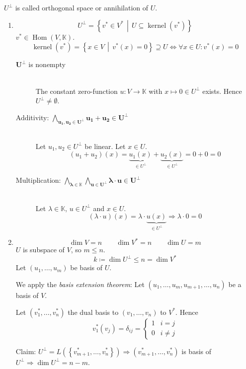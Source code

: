 \documentclass[a4paper]{article}
\theoremstyle{definition}
\DeclareMathOperator\kernel{kernel}
\DeclareMathOperator\Hom{Hom}
\newcommand\set[1]{\left\{#1\right\}}
\newcommand\setdef[2]{\left\{#1\,\middle|\,#2\right\}}
\begin{document}
$U^\bot$ is called orthogonal space or annihilation of $U$.

\begin{enumerate}
  \item
    \[ U^\bot = \setdef{v^* \in V^*}{U \subseteq \kernel(v^*)} \]
    $v^* \in \Hom(V,\mathbb K)$.
    \[ \kernel(v^*) = \setdef{x \in V}{v^*(x) = 0} \supseteq U \Leftrightarrow \forall x \in U: v^*(x) = 0 \]

    \begin{description}
      \item[$\mathbf{U^\bot}$ is nonempty] \hfill{} \\
        The constant zero-function $u: V \to \mathbb K$ with $x \mapsto 0 \in U^\bot$ exists.
        Hence $U^\bot \neq \emptyset$.
      \item[Additivity: $\mathbf{\bigwedge_{u_1,u_2 \in U^\bot} u_1 + u_2 \in U^\bot}$] \hfill{} \\
        Let $u_1,u_2 \in U^\bot$ be linear. Let $x \in U$.
        \[ (u_1 + u_2)(x) = \underbrace{u_1(x)}_{\in U^\bot} + \underbrace{u_2(x)}_{\in U^\bot} = 0 + 0 = 0 \]
      \item[Multiplication: $\mathbf{\bigwedge_{\lambda \in \mathbb K} \bigwedge_{u \in U^\bot} \lambda \cdot u \in U^\bot}$] \hfill{} \\
        Let $\lambda \in \mathbb K$, $u \in U^\bot$ and $x \in U$.
        \[ (\lambda \cdot u)(x) = \lambda \cdot \underbrace{u(x)}_{\in U^\bot} \Rightarrow \lambda \cdot 0 = 0 \]
    \end{description}

  \item
    \[ \dim{V} = n \qquad \dim{V^*} = n \qquad \dim{U} = m \]
    $U$ is subspace of $V$, so $m \leq n$.
    \[ k \coloneqq \dim{U^\bot} \leq n = \dim{V^*} \]
    Let $(u_1, \ldots, u_m)$ be basis of $U$.

    We apply the \emph{basis extension theorem}:
    Let $(u_1, \ldots, u_m, u_{m+1}, \ldots, u_n)$ be a basis of $V$.

    Let $(v_1^*, \ldots, v_n^*)$ the dual basis to $(v_1, \ldots, v_n)$ to $V^*$.
    Hence
    \[ v_1^*(v_j) = \delta_{ij} = \begin{cases} 1 & i=j \\ 0 & i \neq j \end{cases} \]

    Claim: $U^\bot = L(\set{v^*_{m+1}, \ldots, v_n^*}) \Rightarrow (v^*_{m+1}, \ldots, v^*_n)$
    is basis of $U^\bot \Rightarrow \dim{U^\bot} = n - m$.


\end{enumerate}
\end{document}
